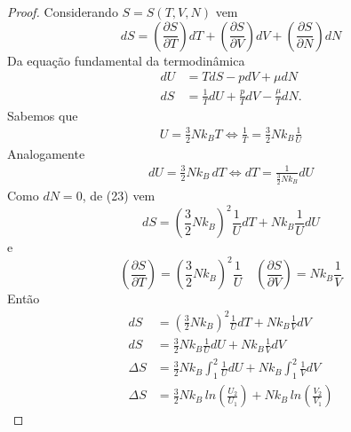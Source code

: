 \documentclass[12pt, twoside, a4paper]{article}
\begin{document}
\begin{enumerate}[1.]
\begin{equation}
  \end{equation}
  \begin{proof}
    Considerando $S=S(T,V,N)$ vem
    \begin{equation}
      dS=\left(\frac{\partial S}{\partial T}\right)dT+\left(\frac{\partial S}{\partial V}\right)dV+\left(\frac{\partial S}{\partial N}\right)dN
    \end{equation}
    Da equação fundamental da termodinâmica
    \begin{equation}
      \begin{split}
      dU &= TdS-pdV+\mu dN\\
      dS &= \frac{1}{T}dU+ \frac{p}{T}dV - \frac{\mu}{T}dN.
      \end{split}
    \end{equation}
    Sabemos que
    \begin{equation}
      \begin{split}
        U = \frac{3}{2}Nk_BT \iff \frac{1}{T}=\frac{3}{2}Nk_B\frac{1}{U}
      \end{split}
    \end{equation}
    Analogamente
    \begin{equation}
      \begin{split}
        dU = \frac{3}{2}Nk_B\,dT \iff dT=\frac{1}{\frac{3}{2}Nk_B}dU
      \end{split}
    \end{equation}
    Como $dN=0$, de (23) vem
    \begin{equation}
      dS=\left(\frac{3}{2}Nk_B\right)^2 \frac{1}{U}dT+Nk_B\frac{1}{U}dU
    \end{equation}
    e
    \begin{equation}
      \left(\frac{\partial S}{\partial T}\right)=\left(\frac{3}{2}Nk_B\right)^2 \frac{1}{U} \quad \left(\frac{\partial S}{\partial V}\right)=Nk_B\frac{1}{V}
    \end{equation}
    Então
    \begin{equation}
      \begin{split}
        dS &= \left(\frac{3}{2}Nk_B\right)^2\frac{1}{U}dT+Nk_B\frac{1}{V}dV \\
        dS &= \frac{3}{2}Nk_B\frac{1}{U}dU+Nk_B\frac{1}{V}dV\\
        \Delta S&=\frac{3}{2}Nk_B \int_1^2 \frac{1}{U}dU + Nk_B \int_1^2 \frac{1}{V}dV \\
        \Delta S&=\frac{3}{2}Nk_B\,ln\left(\frac{U_2}{U_1}\right)+ Nk_B\,ln \left(\frac{V_2}{V_1}\right)
      \end{split}
    \end{equation}
  \end{proof}


\end{enumerate}
\end{document}
